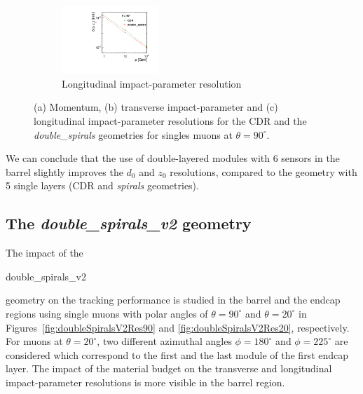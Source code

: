 \begin{figure}[H]
\begin{subfigure}[b]{\textwidth}
          \centering
          \includegraphics[width=0.4\textwidth]{Figures/Geometries/z0_resolution_double.pdf}
          \caption{Longitudinal impact-parameter resolution}
          \label{}
        \end{subfigure}
        \caption{(a) Momentum, (b) transverse impact-parameter and
          (c) longitudinal impact-parameter resolutions for the CDR and
          the {\it double\_spirals} geometries for singles muons at $\theta = 90^\circ$.}\label{fig:doubleLayerRes}
\end{figure}

We can conclude that the use of double-layered modules with 6 sensors in the barrel slightly improves the $d_0$ and $z_0$ resolutions, compared to the geometry with 5 single layers (CDR and \textit{spirals} geometries).

\newpage

\subsection{The \emph{double\_spirals\_v2} geometry}
The impact of the \begin{it}double\_spirals\_v2\end{it} geometry on the tracking performance is studied in the barrel and the endcap regions using single muons with polar angles of $\theta=90^{\circ}$ and $\theta=20^{\circ}$ in Figures~\ref{fig:doubleSpiralsV2Res90} and \ref{fig:doubleSpiralsV2Res20}, respectively. For muons at $\theta=20^{\circ}$, two different azimuthal angles $\phi=180^{\circ}$ and $\phi=225^{\circ}$ are considered which correspond to the first and the last module of the first endcap layer.
The impact of the material budget on the transverse and longitudinal impact-parameter resolutions is more visible in the barrel region.

